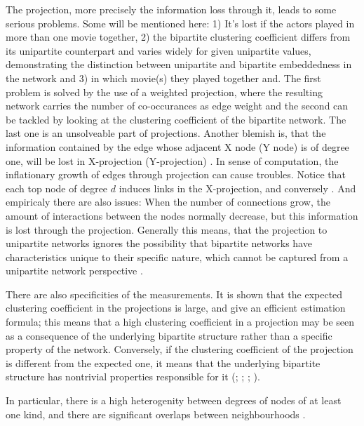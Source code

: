 \documentclass[
a4paper,     %
12pt         %
]{scrartcl}  %
\begin{document}
The projection, more precisely the information loss through it, leads to some serious problems. Some will be mentioned here: 1) It's lost if the actors played in more than one movie together, 2) the bipartite clustering coefficient differs from its unipartite counterpart and varies widely for given unipartite values, demonstrating the distinction between unipartite and bipartite embeddedness in the network \citep{piepenbrink_methodological_2013} and 3) in which movie(s) they played together and. The first problem is solved by the use of a weighted projection, where the resulting network carries the number of co-occurances as edge weight and the second can be tackled by looking at the clustering coefficient of the bipartite network. The last one is an unsolveable part of projections. Another blemish is, that the information contained by the edge whose adjacent X node (Y node) is of degree one, will be lost in X-projection (Y-projection) \citep{zhou_how_2007}. 
In sense of computation, the inflationary growth of edges through projection can cause troubles. Notice that each top node of degree $d$ induces links in the X-projection, and conversely \citep{latapy_basic_2008}. 
And empiricaly there are also issues: When the number of connections grow, the amount of interactions between the nodes normally decrease, but this information is lost through the projection. Generally this means, that the projection to unipartite networks ignores the possibility that bipartite networks have characteristics unique to their specific nature, which cannot be captured from a unipartite network perspective \citep{piepenbrink_methodological_2013}.

There are also specificities of the measurements. It is shown that the expected clustering coefficient in the projections is large, and give an efficient estimation formula; this means that a high clustering coefficient in a projection may be seen as a consequence of the underlying bipartite structure rather than a specific property of the network. Conversely, if the clustering coefficient of the projection is different from the expected one, it means that the underlying bipartite structure has nontrivial properties responsible for it (\cite{latapy_basic_2008}; \cite{newman_random_2001}; \cite{guillaume_bipartite_2004}; \cite{guillaume_bipartite_2006}).

In particular, there is a high heterogenity between degrees of nodes of at least one kind, and there are significant overlaps between neighbourhoods \citep{latapy_basic_2008}.
\end{document}
